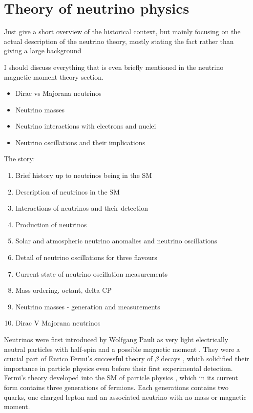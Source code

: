 \chapter{Theory of neutrino physics}\label{sec:NeutrinoTheory}

Just give a short overview of the historical context, but mainly focusing on the actual description of the neutrino theory, mostly stating the fact rather than giving a large background

I should discuss everything that is even briefly mentioned in the neutrino magnetic moment theory section.
\begin{itemize}
\item Dirac vs Majorana neutrinos
\item Neutrino masses
\item Neutrino interactions with electrons and nuclei
\item Neutrino oscillations and their implications
\end{itemize}

The story:
\begin{enumerate}
\item Brief history up to neutrinos being in the SM
\item Description of neutrinos in the SM
\item Interactions of neutrinos and their detection
\item Production of neutrinos
\item Solar and atmospheric neutrino anomalies and neutrino oscillations
\item Detail of neutrino oscillations for three flavours
\item Current state of neutrino oscillation measurements
\item Mass ordering, octant, delta CP
\item Neutrino masses - generation and measurements
\item Dirac V Majorana neutrinos
\end{enumerate}


Neutrinos were first introduced by Wolfgang Pauli \cite{PauliNeutrinoProposalLetter.pdf,TheIdeaOfTheNeutrino.pdf} as very light electrically neutral particles with half-spin and a possible magnetic moment \cite{NeutrinoMagMomentImplications1934.pdf}. They were a crucial part of Enrico Fermi's successful theory of $\beta$ decays \cite{FermisTheoryOfBetaDecayOriginal.pdf, FermisTheoryOfBetaDecay.pdf}, which solidified their importance in particle physics even before their first experimental detection.
Fermi's theory developed into the \gls{SM} of particle physics \cite{SMGlashow.pdf,SMWeinberg.pdf,SMSalam.pdf}, which in its current form contains three generations of fermions. Each generations contains two quarks, one charged lepton and an associated neutrino with no mass or magnetic moment. 

